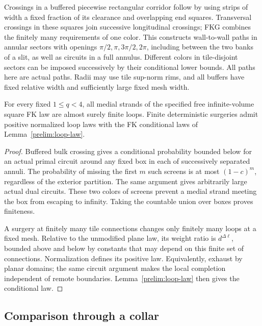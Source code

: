 Crossings in a buffered piecewise rectangular corridor follow by using
strips of width a fixed fraction of its clearance and overlapping end
squares. Transversal crossings in these squares join successive
longitudinal crossings; FKG combines the finitely many requirements of one
color. This constructs wall-to-wall paths in annular sectors with openings
$\pi/2,\pi,3\pi/2,2\pi$, including between the two banks of a slit, as
well as circuits in a full annulus. Different colors in tile-disjoint
sectors can be imposed successively by their conditional lower bounds.
All paths here are actual paths. Radii may use tile sup-norm rims, and all
buffers have fixed relative width and sufficiently large fixed mesh width.

\begin{lemma}\label{prelim:finite-loops}
For every fixed $1\le q<4$, all medial strands of the specified free
infinite-volume square FK law are almost surely finite loops.
Finite deterministic surgeries admit positive normalized loop laws with
the FK conditional laws of Lemma~\ref{prelim:loop-law}.
\end{lemma}

\begin{proof}
Buffered bulk crossing gives a conditional probability bounded below for
an actual primal circuit around any fixed box in each of successively
separated annuli. The probability of missing the first $m$ such screens
is at most $(1-c)^m$, regardless of the exterior partition. The same
argument gives arbitrarily large actual dual circuits. These two colors
of screens prevent a medial strand meeting the box from escaping to
infinity. Taking the countable union over boxes proves finiteness.

A surgery at finitely many tile connections changes only finitely many
loops at a fixed mesh. Relative to the unmodified plane law, its weight
ratio is $d^{\Delta\ell}$, bounded above and below by constants that may
depend on this finite set of connections. Normalization defines its
positive law. Equivalently, exhaust by planar domains; the same circuit
argument makes the local completion independent of remote boundaries.
Lemma~\ref{prelim:loop-law} then gives the conditional law.
\end{proof}

\subsection{Comparison through a collar}


